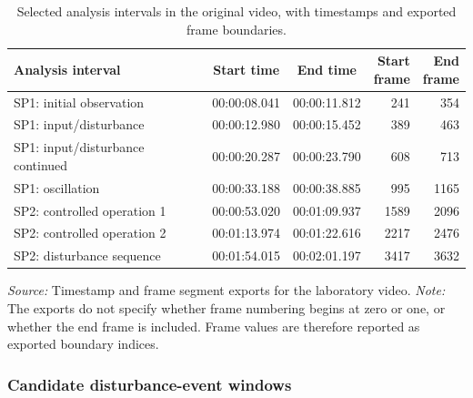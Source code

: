 \documentclass[11pt,a4paper]{article}
\begin{document}
\begin{table}[htbp]
    \centering
    \small
    \caption{Selected analysis intervals in the original video,
    with timestamps and exported frame boundaries.}
    \label{tab:intervals}
    \begin{tabular}{@{}lccrr@{}}
        \toprule
        Analysis interval
        & Start time
        & End time
        & \shortstack{Start\\frame}
        & \shortstack{End\\frame} \\
        \midrule
        SP1: initial observation
        & 00:00:08.041 & 00:00:11.812 & 241 & 354 \\

        SP1: input/disturbance
        & 00:00:12.980 & 00:00:15.452 & 389 & 463 \\

        SP1: input/disturbance continued
        & 00:00:20.287 & 00:00:23.790 & 608 & 713 \\

        SP1: oscillation
        & 00:00:33.188 & 00:00:38.885 & 995 & 1165 \\

        SP2: controlled operation 1
        & 00:00:53.020 & 00:01:09.937 & 1589 & 2096 \\

        SP2: controlled operation 2
        & 00:01:13.974 & 00:01:22.616 & 2217 & 2476 \\

        SP2: disturbance sequence
        & 00:01:54.015 & 00:02:01.197 & 3417 & 3632 \\
        \bottomrule
    \end{tabular}

    \smallskip
    \begin{minipage}{\linewidth}
        \footnotesize
        \textit{Source:} Timestamp and frame segment exports
        for the laboratory video.
        \textit{Note:} The exports do not specify whether
        frame numbering begins at zero or one, or whether
        the end frame is included. Frame values are therefore
        reported as exported boundary indices.
    \end{minipage}
\end{table}

\subsubsection{Candidate disturbance-event windows}
\label{sec:disturbance-windows}
\end{document}
